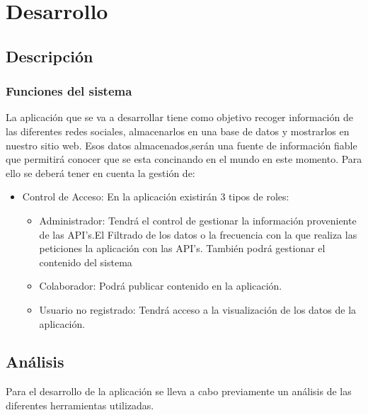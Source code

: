 
\chapter{Desarrollo}

\section{Descripción}

\subsection{Funciones del sistema}

La aplicación que se va a desarrollar tiene como objetivo recoger información de las diferentes redes sociales, almacenarlos en una base de datos y mostrarlos en nuestro sitio web. Esos datos almacenados,serán una fuente de información fiable que permitirá conocer que se esta concinando en el mundo en este momento. Para ello se deberá tener en cuenta la gestión de:


\vspace{5 mm}

\begin{itemize}

\item Control de Acceso: En la aplicación existirán 3 tipos de roles:

\begin{itemize}
\item Administrador: Tendrá el control de gestionar la información proveniente de las API's.El Filtrado de los datos o la frecuencia con la que realiza las peticiones la aplicación con las API's.
También podrá gestionar el contenido del sistema
\item Colaborador: Podrá publicar contenido en la aplicación.
\item Usuario no registrado: Tendrá acceso a la visualización de los datos de la aplicación. 
\end{itemize}

\end{itemize}

\section{Análisis}

Para el desarrollo de la aplicación se lleva a cabo previamente un análisis de las diferentes herramientas utilizadas.

